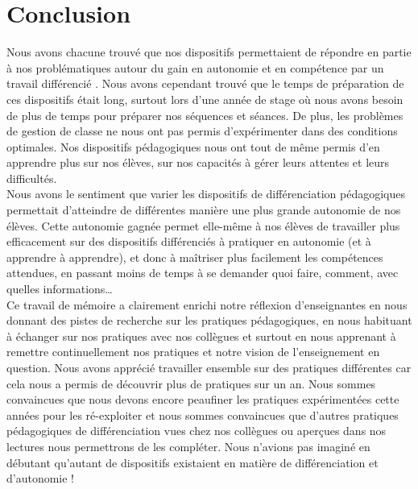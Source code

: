 \section{Conclusion}
Nous avons chacune trouvé que nos dispositifs permettaient de répondre en partie à nos problématiques autour du gain en autonomie et en compétence par un travail différencié . Nous avons cependant trouvé que le temps de préparation de ces dispositifs était long, surtout lors d'une année de stage où nous avons besoin de plus de temps pour préparer nos séquences et séances. De plus, les problèmes de gestion de classe ne nous ont pas permis d'expérimenter dans des conditions optimales. Nos dispositifs pédagogiques nous ont tout de même permis d'en apprendre plus sur nos élèves, sur nos capacités à gérer leurs attentes et leurs difficultés.\\
Nous avons le sentiment que varier les dispositifs de différenciation pédagogiques permettait d'atteindre de différentes manière une plus grande autonomie de nos élèves. Cette autonomie gagnée permet elle-même à nos élèves de travailler plus efficacement sur des dispositifs différenciés à pratiquer en autonomie (et à apprendre à apprendre), et donc à maîtriser plus facilement les compétences attendues, en passant moins de temps à se demander quoi faire, comment, avec quelles informations\ldots \\
Ce travail de mémoire a clairement enrichi notre réflexion d'enseignantes en nous donnant des pistes de recherche sur les pratiques pédagogiques, en nous habituant à échanger sur nos pratiques avec nos collègues et surtout en nous apprenant à remettre continuellement nos pratiques et notre vision de l'enseignement en question. Nous avons apprécié travailler ensemble sur des pratiques différentes car cela nous a permis de découvrir plus de pratiques sur un an. Nous sommes convaincues que nous devons encore peaufiner les pratiques expérimentées cette années pour les ré-exploiter et nous sommes convaincues que d'autres pratiques pédagogiques de différenciation vues chez nos collègues ou aperçues dans nos lectures nous permettrons de les compléter. Nous n'avions pas imaginé en débutant qu'autant de dispositifs existaient en matière de différenciation et d'autonomie !
